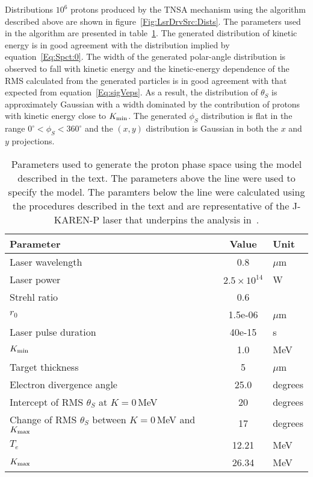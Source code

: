 Distributions $10^6$ protons produced by the TNSA mechanism using the
algorithm described above are shown in
figure~\ref{Fig:LsrDrvSrc:Dists}.
The parameters used in the algorithm are presented in
table~\ref{Tab:Src:Param}.
The generated distribution of kinetic energy is in good agreement with
the distribution implied by equation~\ref{Eq:Spct:0}.
The width of the generated polar-angle distribution is observed to
fall with kinetic energy and the kinetic-energy dependence of the RMS
calculated from the generated particles is in good agreement with that
expected from equation~\ref{Eq:sigVeps}.
As a result, the distribution of $\theta_S$ is approximately Gaussian
with a width dominated by the contribution of protons with kinetic
energy close to $K_{\rm min}$.
The generated $\phi_S$ distribution is flat in the range
$0^\circ < \phi_S < 360^\circ$ and the $(x, y)$ distribution is
Gaussian in both the $x$ and $y$ projections.
\begin{table}
  \caption{
    Parameters used to generate the proton phase space using
    the model described in the text.
    The parameters above the line were used to specify the model.
    The paramters below the line were calculated using the procedures
    described in the text and are representative of the J-KAREN-P
    laser that underpins the analysis in~\cite{DOVER2020100847}.
  }
  \label{Tab:Src:Param}
  \begin{center}
    \begin{tabular}{|l|c|l|}
      \hline
        \textbf{Parameter} & \textbf{Value} & \textbf{Unit} \\ 
        \hline
        Laser wavelength&0.8&$\mu$m \\ 
        Laser power&$2.5\times10^{14}$&W \\ 
        Strehl ratio&0.6& \\ 
        $r_0$&1.5e-06&$\mu$m \\
        Laser pulse duration&40e-15&s \\ 
        $K_{\rm min}$&1.0&MeV \\
        Target thickness&5&$\mu$m \\
        Electron divergence angle&25.0&degrees \\
        Intercept of RMS $\theta_S$ at $K=0$\,MeV & 20 & degrees \\
        Change of RMS $\theta_S$ between $K=0$\,MeV and $K_{\rm max}$
                            & 17 & degrees \\
      \hline
        $T_e$&12.21&MeV \\
        $K_{\rm max}$&26.34&MeV \\
      \hline
    \end{tabular}
  \end{center}
\end{table}

